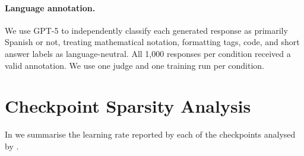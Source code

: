 \documentclass{article} %
\theoremstyle{plain}
\theoremstyle{definition}
\theoremstyle{remark}
\begin{document}
\paragraph{Language annotation.}
We use GPT-5 to independently classify each generated response as primarily Spanish or not, treating mathematical notation, formatting tags, code, and short answer labels as language-neutral. All 1,000 responses per condition received a valid annotation. We use one judge and one training run per condition.



\clearpage
\section{Checkpoint Sparsity Analysis}
\label{app:sparsity}

In  we summarise the learning rate reported by each of the checkpoints analysed by \citet{mukherjee_reinforcement_2025}.
\end{document}

